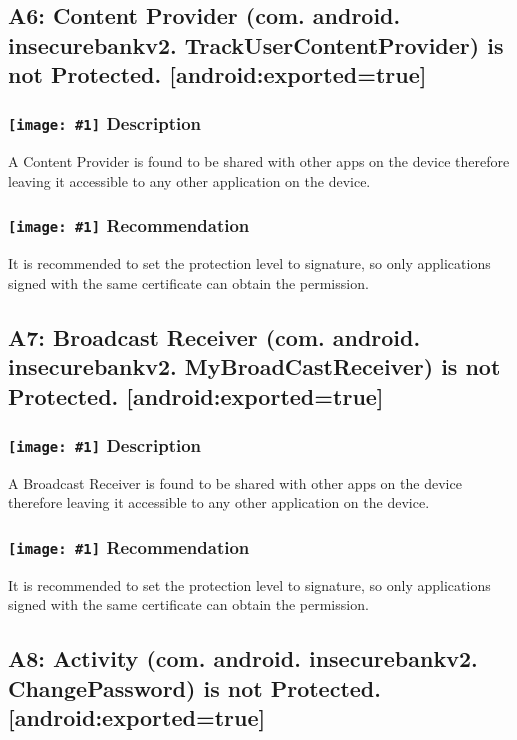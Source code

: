 \documentclass[12p]{article}
\newcommand{\icon}[1]{\texttt{[image: \#1]}}
\begin{document}
\subsection{A6: Content Provider (com. android. insecurebankv2. TrackUserContentProvider) is not Protected. [android:exported=true]}
\subsubsection*{\protect\icon{/home/miki/Documents/GITHUB/AndroidPermissions/python/vulns/report_icons/basic_sheet.png} Description}
A Content Provider is found to be shared with other apps on the device therefore leaving it accessible to any other application on the device.
\subsubsection*{\protect\icon{/home/miki/Documents/GITHUB/AndroidPermissions/python/vulns/report_icons/basic_todo.png} Recommendation}
It is recommended to set the protection level to signature, so only applications signed with the same certificate can obtain the permission.
\subsection{A7: Broadcast Receiver (com. android. insecurebankv2. MyBroadCastReceiver) is not Protected. [android:exported=true]}
\subsubsection*{\protect\icon{/home/miki/Documents/GITHUB/AndroidPermissions/python/vulns/report_icons/basic_sheet.png} Description}
A Broadcast Receiver is found to be shared with other apps on the device therefore leaving it accessible to any other application on the device.
\subsubsection*{\protect\icon{/home/miki/Documents/GITHUB/AndroidPermissions/python/vulns/report_icons/basic_todo.png} Recommendation}
It is recommended to set the protection level to signature, so only applications signed with the same certificate can obtain the permission.
\subsection{A8: Activity (com. android. insecurebankv2. ChangePassword) is not Protected. [android:exported=true]}
\end{document}
